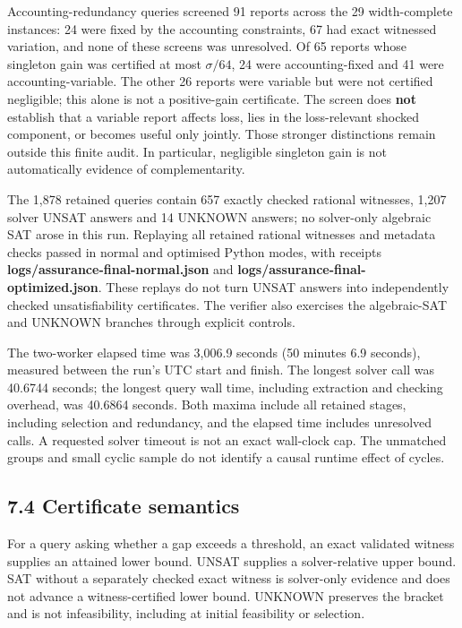 \documentclass[
  british,
  11pt,
  a4paper,
]{article}
\newcounter{none} %
\begin{document}
Accounting-redundancy queries screened 91 reports across the 29
width-complete instances: 24 were fixed by the accounting constraints,
67 had exact witnessed variation, and none of these screens was
unresolved. Of 65 reports whose singleton gain was certified at most
\(\sigma/64\), 24 were accounting-fixed and 41 were accounting-variable.
The other 26 reports were variable but were not certified negligible;
this alone is not a positive-gain certificate. The screen does
\textbf{not} establish that a variable report affects loss, lies in the
loss-relevant shocked component, or becomes useful only jointly. Those
stronger distinctions remain outside this finite audit. In particular,
negligible singleton gain is not automatically evidence of
complementarity.

The 1,878 retained queries contain 657 exactly checked rational
witnesses, 1,207 solver UNSAT answers and 14 UNKNOWN answers; no
solver-only algebraic SAT arose in this run. Replaying all retained
rational witnesses and metadata checks passed in normal and optimised
Python modes, with receipts \textbf{logs/assurance-final-normal.json}
and \textbf{logs/assurance-final-optimized.json}. These replays do not
turn UNSAT answers into independently checked unsatisfiability
certificates. The verifier also exercises the algebraic-SAT and UNKNOWN
branches through explicit controls.

The two-worker elapsed time was 3,006.9 seconds (50 minutes 6.9
seconds), measured between the run's UTC start and finish. The longest
solver call was 40.6744 seconds; the longest query wall time, including
extraction and checking overhead, was 40.6864 seconds. Both maxima
include all retained stages, including selection and redundancy, and the
elapsed time includes unresolved calls. A requested solver timeout is
not an exact wall-clock cap. The unmatched groups and small cyclic
sample do not identify a causal runtime effect of cycles.

\subsection{7.4 Certificate semantics}\label{certificate-semantics}

For a query asking whether a gap exceeds a threshold, an exact validated
witness supplies an attained lower bound. UNSAT supplies a
solver-relative upper bound. SAT without a separately checked exact
witness is solver-only evidence and does not advance a witness-certified
lower bound. UNKNOWN preserves the bracket and is not infeasibility,
including at initial feasibility or selection.
\end{document}
